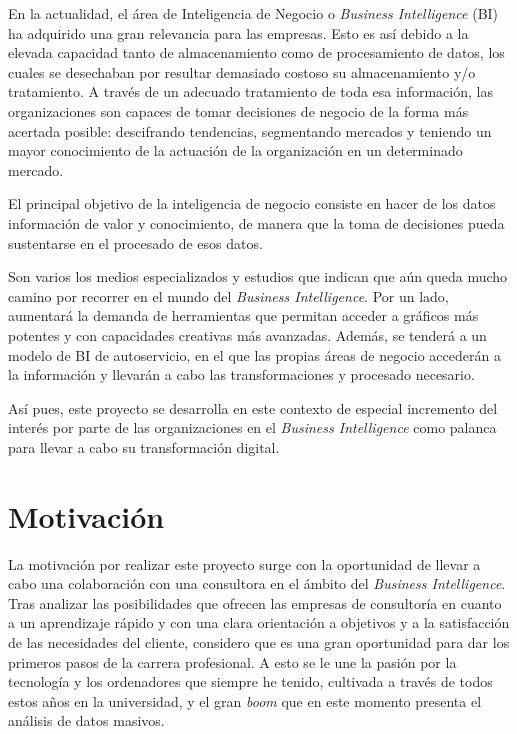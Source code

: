 \documentclass[a4paper, 12pt]{book}
\begin{document}
En la actualidad, el área de Inteligencia de Negocio o \textit{Business Intelligence} (BI) ha adquirido una gran relevancia para las empresas. Esto es así debido a la elevada capacidad tanto de almacenamiento como de procesamiento de datos, los cuales se desechaban por resultar demasiado costoso su almacenamiento y/o tratamiento. A través de un adecuado tratamiento de toda esa información, las organizaciones son capaces de tomar decisiones de negocio de la forma más acertada posible: descifrando tendencias, segmentando mercados y teniendo un mayor conocimiento de la actuación de la organización en un determinado mercado.

El principal objetivo de la inteligencia de negocio consiste en hacer de los datos información de valor y conocimiento, de manera que la toma de decisiones pueda sustentarse en el procesado de esos datos.

Son varios los medios especializados y estudios \cite{BI_tendencies1,BI_tendencies2,BI_tendencies3,BI_tendencies4} que indican que aún queda mucho camino por recorrer en el mundo del \textit{Business Intelligence}. Por un lado, aumentará la demanda de herramientas que permitan acceder a gráficos más potentes y con capacidades creativas más avanzadas. Además, se tenderá a un modelo de BI de autoservicio, en el que las propias áreas de negocio accederán a la información y llevarán a cabo las transformaciones y procesado necesario.

Así pues, este proyecto se desarrolla en este contexto de especial incremento del interés por parte de las organizaciones en el \textit{Business Intelligence} como palanca para llevar a cabo su transformación digital.

\section{Motivación}
\label{sec:motivacion}
La motivación por realizar este proyecto surge con la oportunidad de llevar a cabo una colaboración con una consultora en el ámbito del \textit{Business Intelligence}. Tras analizar las posibilidades que ofrecen las empresas de consultoría en cuanto a un aprendizaje rápido y con una clara orientación a objetivos y a la satisfacción de las necesidades del cliente, considero que es una gran oportunidad para dar los primeros pasos de la carrera profesional. A esto se le une la pasión por la tecnología y los ordenadores que siempre he tenido, cultivada a través de todos estos años en la universidad, y el gran \textit{boom} que en este momento presenta el análisis de datos masivos.
\end{document}
